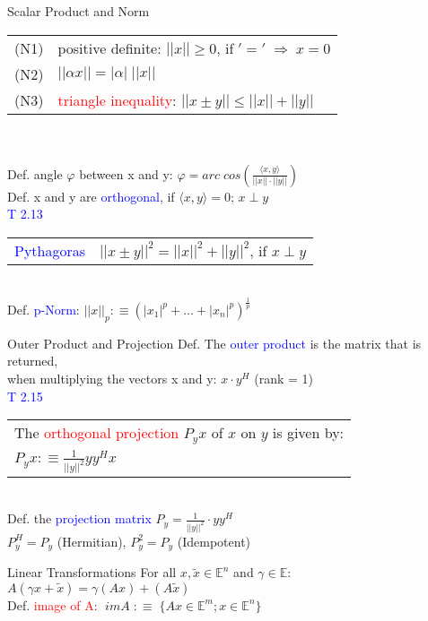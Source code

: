 \begin{mainbox}{Scalar Product and Norm}
\begin{tabular}{ll}
	(N1) & positive definite: $||x|| \geq 0$, if$\;'='\;\Rightarrow\; x = 0$\\
	(N2) & $||\alpha x|| = |\alpha |\;||x||$\\
	(N3) & \textcolor{red}{triangle inequality}: $||x\pm y|| \leq ||x|| + ||y||$\\ 
\end{tabular}\\
\smallskip\\
Def. angle $\varphi$ between x and y: $\varphi = arc\;cos\left(\frac{\langle x,y\rangle}{||x||\cdot ||y||}\right)$
\smallskip\\
Def. x and y are \textcolor{blue}{orthogonal}, if $\langle x,y\rangle = 0$; $x \perp y$
\smallskip\\
\textcolor{blue}{T 2.13}\\
\begin{tabular}{ll}
	\textcolor{blue}{Pythagoras} & $||x \pm y||^2 = ||x||^2 + ||y||^2$, if $x \perp y$\\
\end{tabular}
\smallskip\\
Def. \textcolor{blue}{p-Norm}: $||x||_p :\equiv (|x_1|^p + ... + |x_n|^p)^{\frac{1}{p}}$\\
\end{mainbox}

\begin{mainbox}{Outer Product and Projection}
Def. The \textcolor{blue}{outer product} is the matrix that is returned,\\
when multiplying the vectors x and y: $x\cdot y^H$ (rank = 1)
\smallskip\\
\textcolor{blue}{T 2.15}\\
\begin{tabular}{l}
	The \textcolor{red}{orthogonal projection} $P_yx$ of $x$ on $y$ is given by:\\
	$P_yx :\equiv \frac{1}{||y||^2}yy^Hx$
\end{tabular}
\smallskip\\
Def. the \textcolor{blue}{projection matrix} $P_y = \frac{1}{||y||^2}\cdot yy^H$\\[-5pt]

\quad $P_y^H = P_y$ (Hermitian), $P_y^2 = P_y$ (Idempotent)\\
\end{mainbox}

\begin{mainbox}{Linear Transformations}
For all $x, \tilde{x} \in \mathbb{E}^n$ and $\gamma \in \mathbb{E}$:\\
$A(\gamma x + \tilde{x}) = \gamma (Ax) + (A\tilde{x})$
\smallskip\\
Def. \textcolor{red}{image of A}: $\;imA\;:\equiv\;\{Ax\in \mathbb{E}^m; x\in \mathbb{E}^n\}$\\
\end{mainbox}


